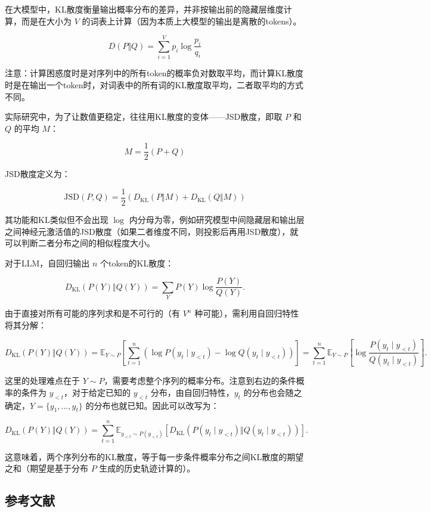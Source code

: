 在大模型中，KL散度衡量输出概率分布的差异，并非按输出前的隐藏层维度计算，而是在大小为 \(V\) 的词表上计算（因为本质上大模型的输出是离散的tokens）。

\[
D(P\Vert Q)=\sum_{i=1}^{V}p_i\log\frac{p_i}{q_i}
\]

注意：计算困惑度时是对序列中的所有token的概率负对数取平均，而计算KL散度时是在输出一个token时，对词表中的所有词的KL散度取平均，二者取平均的方式不同。

实际研究中，为了让数值更稳定，往往用KL散度的变体------JSD散度，即取 \(P\) 和 \(Q\) 的平均 \(M\)：

\[
M=\frac{1}{2}(P+Q)
\]

JSD散度定义为：

\[
\mathrm{JSD}(P,Q)=\frac{1}{2}\left(D_{\mathrm{KL}}(P\Vert M)+D_{\mathrm{KL}}(Q\Vert M)\right)
\]

其功能和KL类似但不会出现 \(\log\) 内分母为零，例如研究模型中间隐藏层和输出层之间神经元激活值的JSD散度（如果二者维度不同，则投影后再用JSD散度），就可以判断二者分布之间的相似程度大小。

对于LLM，自回归输出 \(n\) 个token的KL散度：

\[
D_{\mathrm{KL}}(P(Y)\Vert Q(Y))
=
\sum_Y P(Y)\log\frac{P(Y)}{Q(Y)}.
\]

由于直接对所有可能的序列求和是不可行的（有 \(V^n\) 种可能），需利用自回归特性将其分解：

\[
D_{\mathrm{KL}}(P(Y)\Vert Q(Y))
=
\mathbb{E}_{Y\sim P}
\left[
\sum_{t=1}^{n}
\left(
\log P(y_t\mid y_{<t})-\log Q(y_t\mid y_{<t})
\right)
\right]
=
\sum_{t=1}^{n}
\mathbb{E}_{Y\sim P}
\left[
\log\frac{P(y_t\mid y_{<t})}{Q(y_t\mid y_{<t})}
\right].
\]

这里的处理难点在于 \(Y\sim P\)，需要考虑整个序列的概率分布。注意到右边的条件概率的条件为 \(y_{<t}\)，对于给定已知的 \(y_{<t}\) 分布，由自回归特性，\(y_t\) 的分布也会随之确定，\(Y=\{y_1,\ldots,y_t\}\) 的分布也就已知。因此可以改写为：

\[
D_{\mathrm{KL}}(P(Y)\Vert Q(Y))
=
\sum_{t=1}^{n}
\mathbb{E}_{y_{<t}\sim P(y_{<t})}
\left[
D_{\mathrm{KL}}\left(P(y_t\mid y_{<t})\Vert Q(y_t\mid y_{<t})\right)
\right].
\]

这意味着，两个序列分布的KL散度，等于每一步条件概率分布之间KL散度的期望之和（期望是基于分布 \(P\) 生成的历史轨迹计算的）。

\hypertarget{ux53c2ux8003ux6587ux732e-105}{%
\subsection{参考文献}\label{ux53c2ux8003ux6587ux732e-105}}

